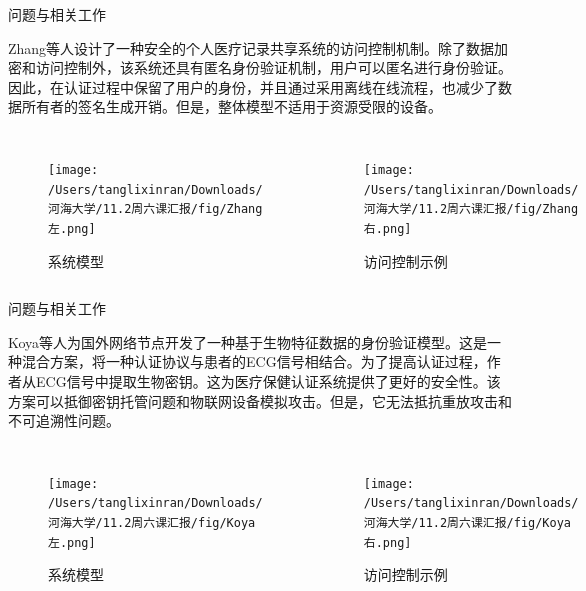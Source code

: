 \documentclass{beamer}
\begin{document}
\begin{frame}{问题与相关工作}
    \footnotesize  %

    Zhang等人设计了一种安全的个人医疗记录共享系统的访问控制机制。除了数据加密和访问控制外，该系统还具有匿名身份验证机制，用户可以匿名进行身份验证。因此，在认证过程中保留了用户的身份，并且通过采用离线在线流程，也减少了数据所有者的签名生成开销。但是，整体模型不适用于资源受限的设备。

    \vspace{0.5cm}  %
    \begin{columns}
        \begin{figure}
            \centering
            \texttt{[image: /Users/tanglixinran/Downloads/河海大学/11.2周六课汇报/fig/Zhang左.png]}
            \caption{系统模型}
        \end{figure}

        \begin{figure}
            \centering
            \texttt{[image: /Users/tanglixinran/Downloads/河海大学/11.2周六课汇报/fig/Zhang右.png]}
            \caption{访问控制示例}
        \end{figure}
    \end{columns}

\end{frame}

\begin{frame}{问题与相关工作}
    \footnotesize  %

    Koya等人为国外网络节点开发了一种基于生物特征数据的身份验证模型。这是一种混合方案，将一种认证协议与患者的ECG信号相结合。为了提高认证过程，作者从ECG信号中提取生物密钥。这为医疗保健认证系统提供了更好的安全性。该方案可以抵御密钥托管问题和物联网设备模拟攻击。但是，它无法抵抗重放攻击和不可追溯性问题。

    \vspace{0.5cm}  %
    \begin{columns}
        \begin{figure}
            \centering
            \texttt{[image: /Users/tanglixinran/Downloads/河海大学/11.2周六课汇报/fig/Koya左.png]}
            \caption{系统模型}
        \end{figure}

        \begin{figure}
            \centering
            \texttt{[image: /Users/tanglixinran/Downloads/河海大学/11.2周六课汇报/fig/Koya右.png]}
            \caption{访问控制示例}
        \end{figure}
    \end{columns}

\end{frame}
\end{document}
